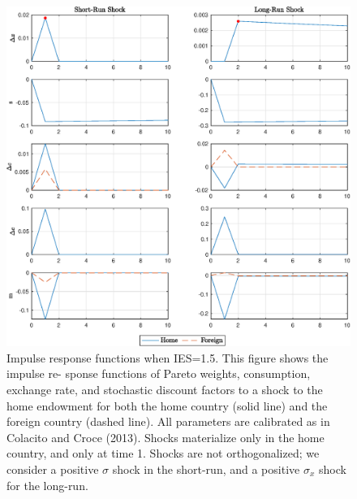 \begin{figure}[h!]
	\centering
	\caption{Impulse response functions when IES=1.5. This figure shows the impulse re- sponse functions of Pareto weights, consumption, exchange rate, and stochastic discount factors to a shock to the home endowment for both the home country (solid line) and the foreign country (dashed line). All parameters are calibrated as in Colacito and Croce (2013). Shocks materialize only in the home country, and only at time 1. Shocks are not orthogonalized; we consider a positive $\sigma$ shock in the short-run, and a positive $\sigma_x$ shock for the long-run.}
	\includegraphics[scale=0.6]{fig/fig5.eps}
\end{figure}